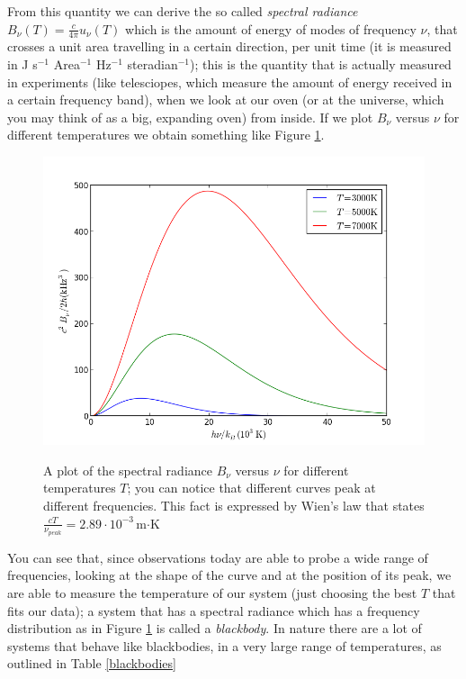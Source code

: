 From this quantity we can derive the so called \textit{spectral radiance} $B_\nu(T)=\frac{c}{4\pi}u_\nu(T)$ which is the amount of energy of modes of frequency $\nu$, that crosses a unit area travelling in a certain direction, per unit time (it is measured in J s$^{-1}$ Area$^{-1}$ Hz$^{-1}$ steradian$^{-1}$); this is the quantity that is actually measured in experiments (like telesciopes, which measure the amount of energy received in a certain frequency band), when we look at our oven (or at the universe, which you may think of as a big, expanding oven) from inside. If we plot $B_\nu$ versus $\nu$ for different temperatures we obtain something like Figure \ref{blackbody1}.
\begin{figure}
\begin{center}
\includegraphics[scale=0.7]{Draw/blackbody.png}
\label{}
\end{center}
\caption{A plot of the spectral radiance $B_\nu$ versus $\nu$ for different temperatures $T$; you can notice that different curves peak at different frequencies. This fact is expressed by Wien's law that states $\frac{cT}{\nu_{peak}}=2.89\cdot10^{-3}\,$m$\cdot$K}
\label{blackbody1}
\end{figure}
You can see that, since observations today are able to probe a wide range of frequencies, looking at the shape of the curve and at the position of its peak, we are able to measure the temperature of our system (just choosing the best $T$ that fits our data); a system that has a spectral radiance which has a frequency distribution as in Figure \ref{blackbody1} is called a \textit{blackbody}. In nature there are a lot of systems that behave like blackbodies, in a very large range of temperatures, as outlined in Table \ref{blackbodies}
